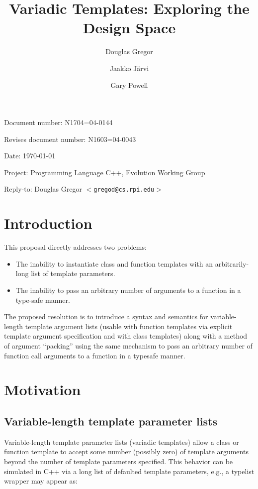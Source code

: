 \documentclass{article}
\begin{document}
\pagestyle{myheadings}

\title{Variadic Templates: Exploring the Design Space}
\author{Douglas Gregor \and Jaakko J\"arvi \and Gary Powell}
\date{}
\maketitle

\par\noindent Document number: N1704=04-0144
\par\noindent Revises document number: N1603=04-0043
\par\noindent Date: \today
\par\noindent Project: Programming Language C++, Evolution Working Group
\par\noindent Reply-to: Douglas Gregor $<${\tt gregod@cs.rpi.edu}$>$

\section{Introduction}
This proposal directly addresses two problems:
\begin{itemize}
\item The inability to instantiate class and function templates with an arbitrarily-long list of template parameters.
\item The inability to pass an arbitrary number of arguments to a function in a type-safe manner.
\end{itemize}

The proposed resolution is to introduce a syntax and semantics for
variable-length template argument lists (usable with function templates
via explicit template argument specification and with class templates)
along with a method of argument ``packing'' using the same mechanism to
pass an arbitrary number of function call arguments to a function in a
typesafe manner.

\section{Motivation}
\subsection{Variable-length template parameter lists}
Variable-length template parameter lists (variadic templates) allow a
class or function template to accept some number (possibly zero) of
template arguments beyond the number of template parameters specified.
This behavior can be simulated in C++ via a long list of defaulted
template parameters, e.g., a typelist wrapper may appear as:
\end{document}
